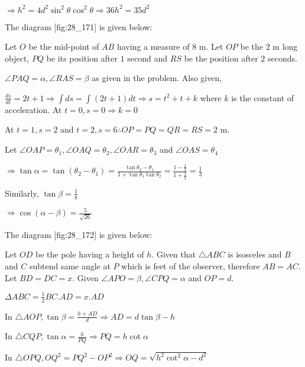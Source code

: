   $\Rightarrow h^2 = 4d^2\sin^2\theta\cos^2\theta \Rightarrow 36h^2 = 35d^2$

\item The diagram [fig:28_171] is given below:

  \startplacefigure[reference=fig:28_171]
    \externalfigure[28_171.pdf]
  \stopplacefigure

  Let $O$ be the mid-point of $AB$ having a measure of $8$ m. Let $OP$ be the
  $2$ m long object, $PQ$ be its position after $1$ second and $RS$ be the
  position after $2$ seconds.

  $\angle PAQ = \alpha, \angle RAS = \beta$ as given in the problem. Also given,

  $\frac{ds}{dt} = 2t + 1 \Rightarrow \int ds = \int(2t + 1)dt \Rightarrow s = t^2 + t + k$
  where $k$ is the constant of acceleration. At $t = 0, s = 0 \Rightarrow k = 0$

  At $t = 1, s = 2$ and $t = 2, s = 6 \therefore OP = PQ = QR = RS = 2$ m.

  Let $\angle OAP = \theta_1, \angle OAQ = \theta_2, \angle OAR = \theta_3$ and $\angle OAS =
  \theta_4$

  $\Rightarrow \tan\alpha = \tan(\theta_2 - \theta_1) = \frac{\tan\theta_2 - \theta_1}{1 +
    \tan\theta_1\tan\theta_2} = \frac{1 - \frac{1}{2}}{1 + \frac{1}{2}} = \frac{1}{3}$

  Similarly, $\tan\beta = \frac{1}{8}$

  $\Rightarrow \cos(\alpha - \beta) = \frac{5}{\sqrt{26}}$

\item The diagram [fig:28_172] is given below:

  \startplacefigure[reference=fig:28_172]
    \externalfigure[28_172.pdf]
  \stopplacefigure

  Let $OD$ be the pole having a height of $h$. Given that $\triangle ABC$ is isosceles
  and $B$ and $C$ subtend same angle at $P$ which is feet of the observer, therefore
  $AB = AC$. Let $BD = DC = x$. Given $\angle APO = \beta, \angle CPQ = \alpha$ and
  $OP = d$.

  $\Delta ABC = \frac{1}{2}BC.AD = x.AD$

  In $\triangle AOP, \tan\beta = \frac{h + AD}{d} \Rightarrow AD = d\tan\beta - h$

  In $\triangle CQP, \tan\alpha = \frac{h}{PQ} \Rightarrow PQ = h\cot\alpha$

  In $\triangle OPQ, OQ^2 = PQ^2 - OP^2 \Rightarrow OQ = \sqrt{h^2\cot^2\alpha - d^2}$

